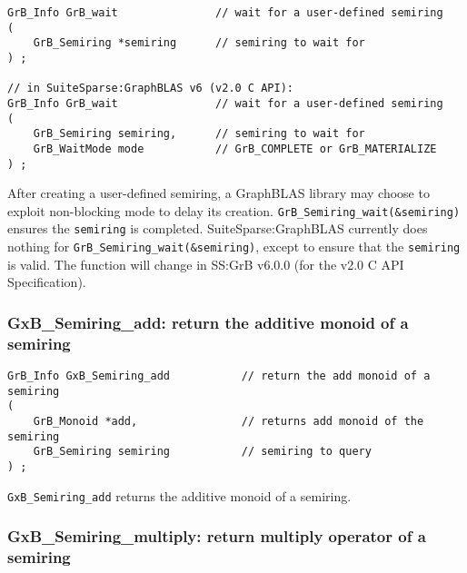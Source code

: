 \documentclass[12pt]{article}
\begin{document}
\begin{mdframed}[userdefinedwidth=6in]
{\footnotesize
\begin{verbatim}
GrB_Info GrB_wait               // wait for a user-defined semiring
(
    GrB_Semiring *semiring      // semiring to wait for
) ;

// in SuiteSparse:GraphBLAS v6 (v2.0 C API):
GrB_Info GrB_wait               // wait for a user-defined semiring
(
    GrB_Semiring semiring,      // semiring to wait for
    GrB_WaitMode mode           // GrB_COMPLETE or GrB_MATERIALIZE
) ;
\end{verbatim}
}\end{mdframed}

After creating a user-defined semiring, a GraphBLAS library may choose to
exploit non-blocking mode to delay its creation.
\verb'GrB_Semiring_wait(&semiring)' ensures the \verb'semiring' is completed.
SuiteSparse:GraphBLAS currently does nothing for
\verb'GrB_Semiring_wait(&semiring)', except to ensure that the \verb'semiring'
is valid.
The function will change in SS:GrB v6.0.0 (for the v2.0 C API Specification).

\subsubsection{{\sf GxB\_Semiring\_add:} return the additive monoid of a semiring}
\label{semiring_add}

\begin{mdframed}[userdefinedwidth=6in]
{\footnotesize
\begin{verbatim}
GrB_Info GxB_Semiring_add           // return the add monoid of a semiring
(
    GrB_Monoid *add,                // returns add monoid of the semiring
    GrB_Semiring semiring           // semiring to query
) ;
\end{verbatim}
} \end{mdframed}

\verb'GxB_Semiring_add' returns the additive monoid of a semiring.

\subsubsection{{\sf GxB\_Semiring\_multiply:} return multiply operator of a semiring}
\label{semiring_multiply}
\end{document}

